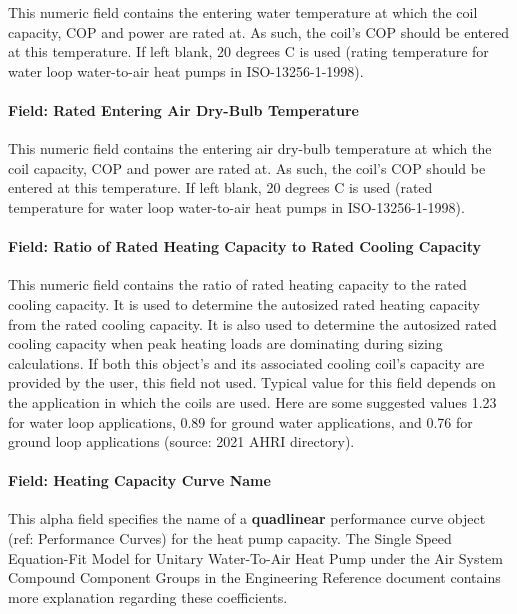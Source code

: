 This numeric field contains the entering water temperature at which the coil capacity, COP and power are rated at. As such, the coil's COP should be entered at this temperature. If left blank, 20 degrees C is used (rating temperature for water loop water-to-air heat pumps in ISO-13256-1-1998).

\paragraph{Field: Rated Entering Air Dry-Bulb Temperature}\label{field-rated-entering-air-dry-bulb-temperature-1}

This numeric field contains the entering air dry-bulb temperature at which the coil capacity, COP and power are rated at. As such, the coil's COP should be entered at this temperature. If left blank, 20 degrees C is used (rated temperature for water loop water-to-air heat pumps in ISO-13256-1-1998).

\paragraph{Field: Ratio of Rated Heating Capacity to Rated Cooling Capacity}\label{field-rated-heating-capacity-to-rated-cooling-capacity}

This numeric field contains the ratio of rated heating capacity to the rated cooling capacity. It is used to determine the autosized rated heating capacity from the rated cooling capacity. It is also used to determine the autosized rated cooling capacity when peak heating loads are dominating during sizing calculations. If both this object's and its associated cooling coil's capacity are provided by the user, this field not used. Typical value for this field depends on the application in which the coils are used. Here are some suggested values 1.23 for water loop applications, 0.89 for ground water applications, and 0.76 for ground loop applications (source: 2021 AHRI directory).

\paragraph{Field: Heating Capacity Curve Name}\label{field-heating-capacity-curve-name}

This alpha field specifies the name of a \textbf{quadlinear} performance curve object (ref: Performance Curves) for the heat pump capacity. The Single Speed Equation-Fit Model for Unitary Water-To-Air Heat Pump under the Air System Compound Component Groups in the Engineering Reference document contains more explanation regarding these coefficients.

